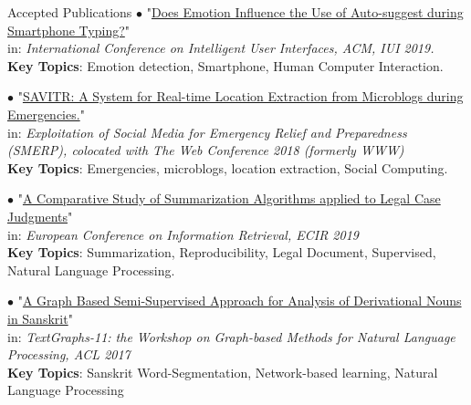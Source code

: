 \documentclass{resume} %
\begin{document}
\begin{rSection}{Accepted Publications}
$\bullet$ "\href{https://iui.acm.org/2019/acceptedpapers.html#shortpapers}{Does Emotion Influence the Use of Auto-suggest during Smartphone Typing?}" \\
in: \textit{International Conference on Intelligent User Interfaces, ACM, IUI 2019.} \\
\textbf{\small Key Topics}: Emotion detection, Smartphone, Human Computer Interaction.

$\bullet$ "\href{https://www2018.thewebconf.org/proceedings/#wrk-131}{SAVITR: A System for Real-time Location Extraction from Microblogs during Emergencies.}" \\
in: \textit{Exploitation of Social Media for Emergency Relief and Preparedness (SMERP), colocated with The Web Conference 2018 (formerly WWW)}\\
\textbf{\small Key Topics}: Emergencies, microblogs, location extraction, Social Computing.

$\bullet$ "\href{https://ecir2019.org/accepted-papers/#reproducibilitypapers}{A Comparative Study of Summarization Algorithms applied to Legal Case Judgments}" \\
in: \textit{European Conference on Information Retrieval, ECIR 2019} \\
\textbf{\small Key Topics}: Summarization, Reproducibility, Legal Document, Supervised, Natural Language Processing.

$\bullet$ "\href{http://www.aclweb.org/anthology/W17-2409}{A Graph Based Semi-Supervised Approach for Analysis of Derivational Nouns in Sanskrit}" \\
in: \textit{TextGraphs-11: the Workshop on Graph-based Methods for Natural Language Processing, ACL 2017}\\
\textbf{\small Key Topics}: Sanskrit Word-Segmentation, Network-based learning, Natural Language Processing

\end{rSection}
\end{document}
